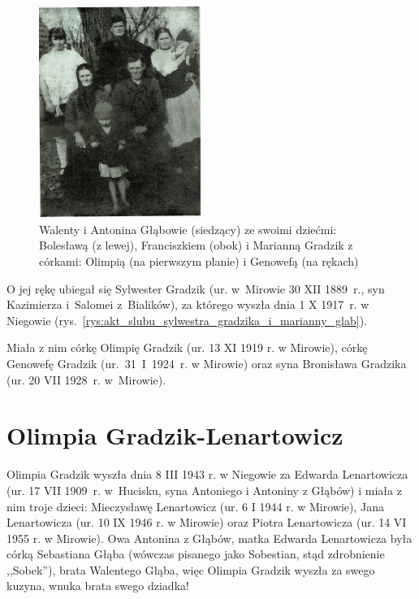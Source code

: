 \begin{figure}[!hb]
\begin{center}
\includegraphics[width=0.47\textwidth]{zdjecia/walenty_antonina_marianna_olimpia.jpg}
\caption[Walenty i Antonina Głąbowie z dziećmi: Bolesławą, Franciszkiem i Marianną Gradzik z córkami: Olimpią i Genowefą]{Walenty i Antonina Głąbowie (siedzący) ze swoimi dziećmi: Bolesławą (z lewej), Franciszkiem (obok) i Marianną Gradzik z córkami: Olimpią (na pierwszym planie) i Genowefą (na rękach)}
\label{rys:walenty_antonina_marianna_olimpia}
\end{center}
\end{figure}

O jej rękę ubiegał się Sylwester Gradzik (ur. w~Mirowie 30 XII 1889~r., syn Kazimierza i~Salomei z~Bialików), za którego wyszła dnia 1 X 1917~r. w Niegowie (rys.~\ref{rys:akt_slubu_sylwestra_gradzika_i_marianny_glab}).

Miała z nim córkę Olimpię Gradzik (ur. 13 XI 1919 r. w Mirowie), córkę Genowefę Gradzik (ur.~31~I~1924~r. w Mirowie) oraz syna Bronisława Gradzika (ur. 20 VII 1928~r. w~Mirowie).

\section{Olimpia Gradzik-Lenartowicz}
Olimpia Gradzik wyszła dnia 8 III 1943 r. w Niegowie za Edwarda Lenartowicza (ur. 17 VII 1909~r. w~Hucisku, syna Antoniego i Antoniny z Głąbów) i miała z nim troje dzieci: Mieczysławę Lenartowicz (ur. 6 I 1944 r. w Mirowie), Jana Lenartowicza (ur. 10 IX 1946 r. w Mirowie) oraz Piotra Lenartowicza (ur. 14 VI  1955 r. w Mirowie). Owa Antonina z Głąbów, matka Edwarda Lenartowicza była córką Sebastiana Głąba (wówczas pisanego jako Sobestian, stąd zdrobnienie ,,Sobek''), brata Walentego Głąba, więc Olimpia Gradzik wyszła za swego kuzyna, wnuka brata swego dziadka!

